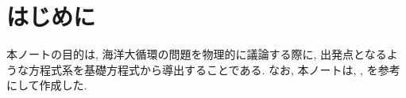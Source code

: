 \chapter{はじめに}

本ノートの目的は, 海洋大循環の問題を物理的に議論する際に, 
出発点となるような方程式系を基礎方程式から導出することである.  
なお, 本ノートは, \citep{vallis2006atmospheric}, \citep{pedlosky1987geophysical}を参考にして作成した. 
